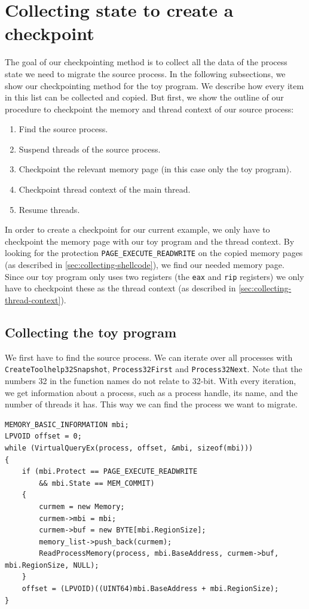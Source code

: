 \documentclass[a4paper, 11pt, english]{report}
\begin{document}
\section{Collecting state to create a checkpoint}
\label{sec:collecting-the-relevant-data}
The goal of our checkpointing method is to collect all the data of the process state we need to migrate the source process.
In the following subsections, we show our checkpointing method for the toy program. We describe how every item in this list can be collected and copied. 
But first, we show the outline of our procedure to checkpoint the memory and thread context of our source process:


\begin{enumerate}
	\item Find the source process.
	\item Suspend threads of the source process.
	\item Checkpoint the relevant memory page (in this case only the toy program).
	\item Checkpoint thread context of the main thread.
	\item Resume threads.
\end{enumerate}

In order to create a checkpoint for our current example, we only have to checkpoint the memory page with our toy program and the thread context.
By looking for the protection \texttt{PAGE\_EXECUTE\_READWRITE} on the copied memory pages (as described in \autoref{sec:collecting-shellcode}), we find our needed memory page.
Since our toy program only uses two registers (the \texttt{eax} and \texttt{rip} registers) we only have to checkpoint these as the thread context (as described in \autoref{sec:collecting-thread-context}).

\subsection{Collecting the toy program}
\label{sec:collecting-shellcode}
We first have to find the source process. We can iterate over all processes with \texttt{CreateToolhelp32Snapshot}, \texttt{Process32First} and \texttt{Process32Next}. Note that the numbers 32 in the function names do not relate to 32-bit. 
With every iteration, we get information about a process, such as a process handle, its name, and the number of threads it has. This way we can find the process we want to migrate.

\begin{lstlisting}[float=h,label=lst:mem-pages,language={[Visual]C++},caption={Reading all memory pages from a process}]
MEMORY_BASIC_INFORMATION mbi;
LPVOID offset = 0;	
while (VirtualQueryEx(process, offset, &mbi, sizeof(mbi)))
{
	if (mbi.Protect == PAGE_EXECUTE_READWRITE 
	    && mbi.State == MEM_COMMIT)
	{
		curmem = new Memory;
		curmem->mbi = mbi;
		curmem->buf = new BYTE[mbi.RegionSize];
		memory_list->push_back(curmem);
		ReadProcessMemory(process, mbi.BaseAddress, curmem->buf, mbi.RegionSize, NULL);	
	}
	offset = (LPVOID)((UINT64)mbi.BaseAddress + mbi.RegionSize);
}
\end{lstlisting}
\end{document}

